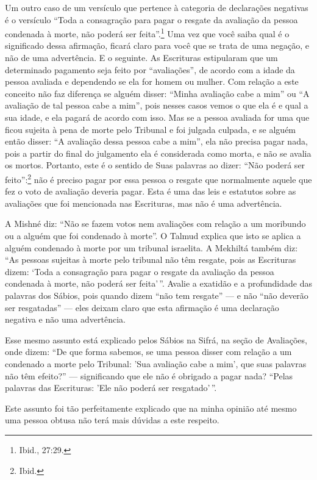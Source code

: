 Um outro caso de um versículo que pertence à categoria de declarações
negativas é o versículo ``Toda a consagração para pagar o resgate da
avaliação da pessoa condenada à morte, não poderá ser feita''.\footnote{Ibid.,
27:29.} Uma vez que você saiba qual é o significado dessa afirmação,
ficará claro para você que se trata de uma negação, e não de uma
advertência. E o seguinte. As Escrituras estipularam que um determinado
pagamento seja feito por ``avaliações'', de acordo com a idade da pessoa
avaliada e dependendo se ela for homem ou mulher. Com relação a este
conceito não faz diferença se alguém disser: ``Minha avaliação cabe a
mim'' ou ``A avaliação de tal pessoa cabe a mim'', pois nesses casos
vemos o que ela é e qual a sua idade, e ela pagará de acordo com isso.
Mas se a pessoa avaliada for uma que ficou sujeita à pena de morte pelo
Tribunal e foi julgada culpada, e se alguém então disser: ``A avaliação
dessa pessoa cabe a mim'', ela não precisa pagar nada, pois a partir do
final do julgamento ela é considerada como morta, e não se avalia os
mortos. Portanto, este é o sentido de Suas palavras ao dizer: ``Não
poderá ser feito'':\footnote{Ibid.} não é preciso pagar por essa pessoa o
resgate que normalmente aquele que fez o voto de avaliação deveria
pagar. Esta é uma das leis e estatutos sobre as avaliações que foi
mencionada nas Escrituras, mas não é uma advertência.

A Mishné diz: ``Não se fazem votos nem avaliações com relação a um
moribundo ou a alguém que foi condenado à morte''. O Talmud explica que
isto se aplica a alguém condenado à morte por um tribunal israelita. A
Mekhiltá também diz: ``As pessoas sujeitas à morte pelo tribunal não têm
resgate, pois as Escrituras dizem: `Toda a consagração para pagar o
resgate da avaliação da pessoa condenada à morte, não poderá ser
feita'\,''. Avalie a exatidão e a profundidade das palavras dos Sábios,
pois quando dizem ``não tem resgate'' --- e não ``não deverão ser
resgatadas'' --- eles deixam claro que esta afirmação é uma declaração
negativa e não uma advertência.

Esse mesmo assunto está explicado pelos Sábios na Sifrá, na seção de
Avaliações, onde dizem: ``De que forma sabemos, se uma pessoa disser com
relação a um condenado a morte pelo Tribunal: 'Sua avaliação cabe a
mim', que suas palavras não têm efeito?'' --- significando que ele não é
obrigado a pagar nada? ``Pelas palavras das Escrituras: 'Ele não poderá
ser resgatado'\,''.

Este assunto foi tão perfeitamente explicado que na minha opinião até
mesmo uma pessoa obtusa não terá mais dúvidas a este respeito.

